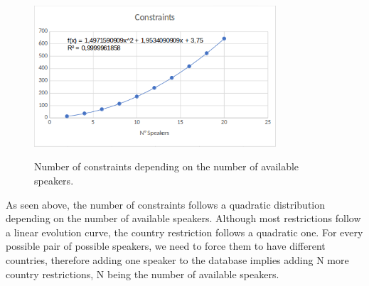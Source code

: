 \documentclass[runningheads,a4paper]{llncs}
\begin{document}
\begin{figure}[!h]
\centering
\includegraphics[width=9cm,height=6cm]{Constraints}
\caption{Number of constraints depending on the number of available speakers.}
\label{fig:Graph1}
\end{figure}

As seen above, the number of constraints follows a quadratic distribution depending on the number of available speakers. Although most restrictions follow a linear evolution curve, the country restriction follows a quadratic one. For every possible pair of possible speakers, we need to force them to have different countries, therefore adding one speaker to the database implies adding N more country restrictions, N being the number of available speakers.
\end{document}
